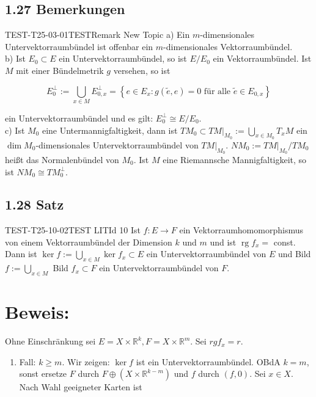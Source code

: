 \subsection*{1.27 Bemerkungen}
\begin{REM}{TEST-T25-03-01}{TESTRemark New Topic}
a) Ein $m$-dimensionales Untervektorraumbündel ist offenbar ein $m$-dimensionales Vektorraumbündel.\\
b) Ist $E_{0} \subset E$ ein Untervektorraumbündel, so ist $E / E_{0}$ ein Vektorraumbündel. Ist $M$ mit einer Bündelmetrik $g$ versehen, so ist

$$
E_{0}^{\perp}:=\bigcup_{x \in M} E_{0, x}^{\perp}=\left\{e \in E_{x}: g(\tilde{e}, e)=0 \text { für alle } \tilde{e} \in E_{0, x}\right\}
$$

ein Untervektorraumbündel und es gilt: $E_{0}^{\perp} \cong E / E_{0}$.\\
c) Ist $M_{0}$ eine Untermannigfaltigkeit, dann ist $\left.T M_{0} \subset T M\right|_{M_{0}}:=\bigcup_{x \in M_{0}} T_{x} M$ ein $\operatorname{dim} M_{0}$-dimensionales Untervektorraumbündel von $\left.T M\right|_{M_{0}}$. $N M_{0}:=\left.T M\right|_{M_{0}} / T M_{0}$ heißt das Normalenbündel von $M_{0}$. Ist $M$ eine Riemannsche Mannigfaltigkeit, so ist $N M_{0} \cong T M_{0}^{\perp}$.
\end{REM}

\subsection*{1.28 Satz}
\begin{PROOF}{TEST-T25-10-02}{TEST LITId 10}
Ist $f: E \rightarrow F$ ein Vektorraumhomomorphismus von einem Vektorraumbündel der Dimension $k$ und $m$ und ist $\operatorname{rg} f_{x}=$ const.\\
Dann ist $\operatorname{ker} f:=\bigcup_{x \in M} \operatorname{ker} f_{x} \subset E$ ein Untervektorraumbündel von $E$ und Bild $f:=\bigcup_{x \in M}$ Bild $f_{x} \subset F$ ein Untervektorraumbündel von $F$.
\end{PROOF}

\section*{Beweis:}
Ohne Einschränkung sei $E=X \times \mathbb{R}^{k}, F=X \times \mathbb{R}^{m}$. Sei $r g f_{x}=r$.

\begin{enumerate}
  \item Fall: $k \geq m$. Wir zeigen: $\operatorname{ker} f$ ist ein Untervektorraumbündel. OBdA $k=m$, sonst ersetze $F$ durch $F \oplus\left(X \times \mathbb{R}^{k-m}\right)$ und $f$ durch $(f, 0)$. Sei $x \in X$. Nach Wahl geeigneter Karten ist
\end{enumerate}

